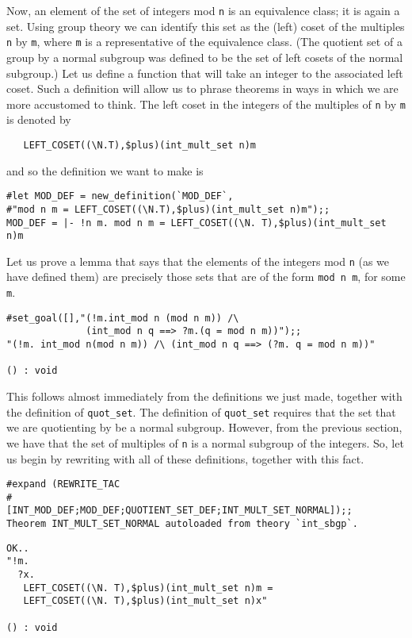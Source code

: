 Now, an element of the set of integers mod {\small\tt n} is an
equivalence class; it is again a set.  Using group theory we can
identify this set as the (left) coset of the multiples {\small\tt n}
by {\small\tt m}, where {\small\tt m} is a representative of the
equivalence class.  (The quotient set of a group by a normal subgroup
was defined to be the set of left cosets of the normal subgroup.)  Let
us define a function that will take an integer to the associated left
coset.  Such a definition will allow us to phrase theorems in ways in
which we are more accustomed to think.  The left coset in the integers
of the multiples of {\small\tt n} by {\small\tt m} is denoted by 
\begin{verbatim}
   LEFT_COSET((\N.T),$plus)(int_mult_set n)m
\end{verbatim}
and so the definition we want to make is
\begin{session}
\begin{verbatim}
#let MOD_DEF = new_definition(`MOD_DEF`,
#"mod n m = LEFT_COSET((\N.T),$plus)(int_mult_set n)m");;
MOD_DEF = |- !n m. mod n m = LEFT_COSET((\N. T),$plus)(int_mult_set n)m
\end{verbatim}
\end{session}

Let us prove a lemma that says that the elements of the integers mod
{\small\tt n} (as we have defined them) are precisely those sets that
are of the form {\small\verb+mod n m+}, for some {\small\tt m}.
\begin{session}
\begin{verbatim}
#set_goal([],"(!m.int_mod n (mod n m)) /\
              (int_mod n q ==> ?m.(q = mod n m))");;
"(!m. int_mod n(mod n m)) /\ (int_mod n q ==> (?m. q = mod n m))"

() : void
\end{verbatim}
\end{session}

This follows almost immediately from the definitions we just made,
together with the definition of {\small\verb+quot_set+}.  The
definition of {\small\verb+quot_set+} requires that the set that we
are quotienting by be a normal subgroup.  However, from the previous
section, we have that the set of multiples of {\small\tt n} is a
normal subgroup of the integers.  So, let us begin by rewriting with
all of these definitions, together with this fact. 
\begin{session}
\begin{verbatim}
#expand (REWRITE_TAC
#         [INT_MOD_DEF;MOD_DEF;QUOTIENT_SET_DEF;INT_MULT_SET_NORMAL]);;
Theorem INT_MULT_SET_NORMAL autoloaded from theory `int_sbgp`.
\end{verbatim}
\mvdots
\begin{verbatim}
OK..
"!m.
  ?x.
   LEFT_COSET((\N. T),$plus)(int_mult_set n)m =
   LEFT_COSET((\N. T),$plus)(int_mult_set n)x"

() : void
\end{verbatim}
\end{session}

